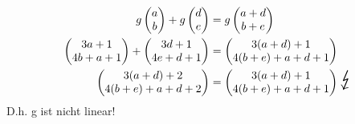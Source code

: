 \documentclass[titlepage]{article}
\newcommand{\1}{\mathbb{1}}
\newcommand{\0}{\mathbb{0}}
\begin{document}
		\begin{align*}
			g\begin{pmatrix}a\\b\end{pmatrix}
			+
			g\begin{pmatrix}d\\e\end{pmatrix}
			&=
			g\begin{pmatrix}a+d\\b+e\end{pmatrix}
			\\
			\begin{pmatrix}3a+1\\4b+a+1\end{pmatrix}
			+
			\begin{pmatrix}3d+1\\4e+d+1\end{pmatrix}
			&=
			\begin{pmatrix}3(a+d)+1\\4(b+e)+a+d+1\end{pmatrix}
			\\
			\begin{pmatrix}3(a+d)+2\\4(b+e)+a+d+2\end{pmatrix}
			&=
			\begin{pmatrix}3(a+d)+1\\4(b+e)+a+d+1\end{pmatrix}\scalebox{2}{$\lightning$}
		\end{align*}
		D.h. g ist nicht linear!
\end{document}
